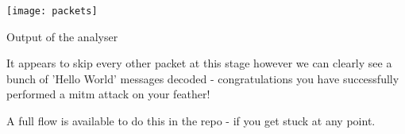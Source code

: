 \centrefigurestart
\texttt{[image: packets]}
\caption{Output of the analyser}
\centrefigureend

It appears to skip every other packet at this stage however we can clearly see a bunch of 'Hello World' messages decoded - congratulations you have successfully performed a \gls{mitm} attack on your feather!

A full flow is available to do this in the \gls{repo} - if you get stuck at any point.
